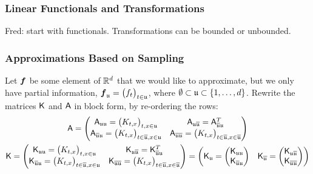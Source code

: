 \documentclass[reqno]{amsart}
\newcommand{\FredNote}[1]{{\color{blue}Fred: #1}}
\begin{document}
\subsubsection{Linear Functionals and Transformations}
\FredNote{start with functionals.  Transformations can be bounded or unbounded.}

\subsubsection{Approximations Based on Sampling}


Let $\boldsymbol{f}$ be some element of $\mathbb{R}^d$ that we would like to approximate, but we only have partial information, $\boldsymbol{f}_{\mathfrak{u}} = \bigl( f_t \bigr)_{t \in \mathfrak{u}}$, where $\emptyset \subset \mathfrak{u} \subset \{1, \ldots, d\}$.  Rewrite the matrices $\mathsf{K}$ and $\mathsf{A}$ in block form, by re-ordering the rows:
\begin{gather*}
\mathsf{A} = \begin{pmatrix}
\mathsf{A}_{\mathfrak{u} \mathfrak{u}} = \bigl(K_{t,x} \bigr)_{t,x \in \mathfrak{u}} & 
\mathsf{A}_{\mathfrak{u} \overline{\mathfrak{u}}} = \mathsf{A}_{\overline{\mathfrak{u}} \mathfrak{u}}^T \\
\mathsf{A}_{\overline{\mathfrak{u}} \mathfrak{u}} = \bigl(K_{t,x} \bigr)_{t \in \overline{\mathfrak{u}},x \in \mathfrak{u}} &
\mathsf{A}_{\overline{\mathfrak{u}} \overline{\mathfrak{u}}} = \bigl(K_{t,x} \bigr)_{t \in \overline{\mathfrak{u}},x \in \overline{\mathfrak{u}}}
\end{pmatrix} \\
\mathsf{K} = \begin{pmatrix}
\mathsf{K}_{\mathfrak{u} \mathfrak{u}} = \bigl(K_{t,x} \bigr)_{t,x \in \mathfrak{u}} & 
\mathsf{K}_{\mathfrak{u} \overline{\mathfrak{u}}} = \mathsf{K}_{\overline{\mathfrak{u}} \mathfrak{u}}^T \\
\mathsf{K}_{\overline{\mathfrak{u}} \mathfrak{u}} = \bigl(K_{t,x} \bigr)_{t \in \overline{\mathfrak{u}},x \in \mathfrak{u}} &
\mathsf{K}_{\overline{\mathfrak{u}} \overline{\mathfrak{u}}} = \bigl(K_{t,x} \bigr)_{t \in \overline{\mathfrak{u}},x \in \overline{\mathfrak{u}}}
\end{pmatrix} = 
\begin{pmatrix} \mathsf{K}_{\mathfrak{u}} = \begin{pmatrix}
\mathsf{K}_{\mathfrak{u} \mathfrak{u}} \\ \mathsf{K}_{\overline{\mathfrak{u}} \mathfrak{u}} 
\end{pmatrix} & \mathsf{K}_{\overline{\mathfrak{u}}} = \begin{pmatrix}
\mathsf{K}_{\mathfrak{u} \overline{\mathfrak{u}}} \\ \mathsf{K}_{\overline{\mathfrak{u}} \overline{\mathfrak{u}}}
\end{pmatrix} \end{pmatrix}
\end{gather*}
\end{document}

